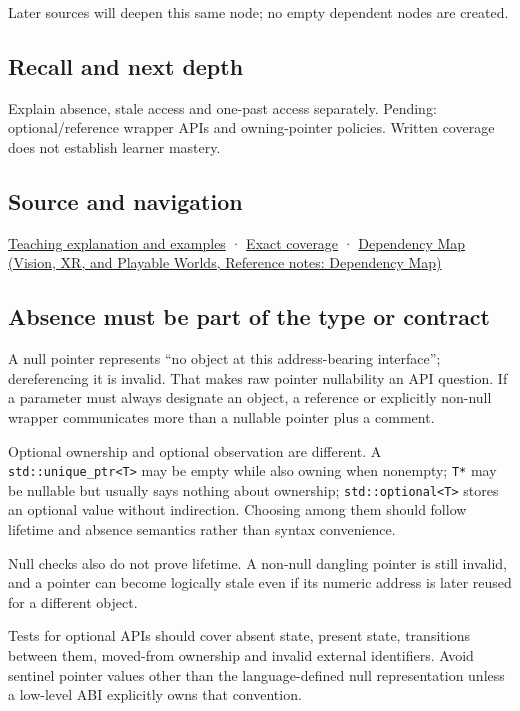 Later sources will deepen this same node; no empty dependent nodes are created.

\subsection{Recall and next depth}\label{appendix-afae48c31800-recall-and-next-depth}

\hypertarget{appendix-afae48c31800-recall-and-next-depth}{}

Explain absence, stale access and one-past access separately. Pending: optional/reference wrapper APIs and owning-pointer policies. Written coverage does not establish learner mastery.

\subsection{Source and navigation}\label{appendix-afae48c31800-source-and-navigation}

\hypertarget{appendix-afae48c31800-source-and-navigation}{}

\hyperref[01-foundations-i-ch003-a-pointer-carries-an-access-contract]{Teaching explanation and examples} · \hyperref[appendix-fd090d982a15-m008---parts-113-126]{Exact coverage} · \href{../07-Vision-XR-and-Playable-Worlds/main.pdf\#nameddest=appendix-4ad47bdd269a}{Dependency Map (Vision, XR, and Playable Worlds, Reference notes: Dependency Map)}

\subsection{Absence must be part of the type or contract}\label{appendix-afae48c31800-absence-must-be-part-of-the-type-or-contract}

\hypertarget{appendix-afae48c31800-absence-must-be-part-of-the-type-or-contract}{}

A null pointer represents ``no object at this address-bearing interface''; dereferencing it is invalid. That makes raw pointer nullability an API question. If a parameter must always designate an object, a reference or explicitly non-null wrapper communicates more than a nullable pointer plus a comment.

Optional ownership and optional observation are different. A \texttt{std::unique\_ptr\textless{}T\textgreater{}} may be empty while also owning when nonempty; \texttt{T*} may be nullable but usually says nothing about ownership; \texttt{std::optional\textless{}T\textgreater{}} stores an optional value without indirection. Choosing among them should follow lifetime and absence semantics rather than syntax convenience.

Null checks also do not prove lifetime. A non-null dangling pointer is still invalid, and a pointer can become logically stale even if its numeric address is later reused for a different object.

Tests for optional APIs should cover absent state, present state, transitions between them, moved-from ownership and invalid external identifiers. Avoid sentinel pointer values other than the language-defined null representation unless a low-level ABI explicitly owns that convention.
